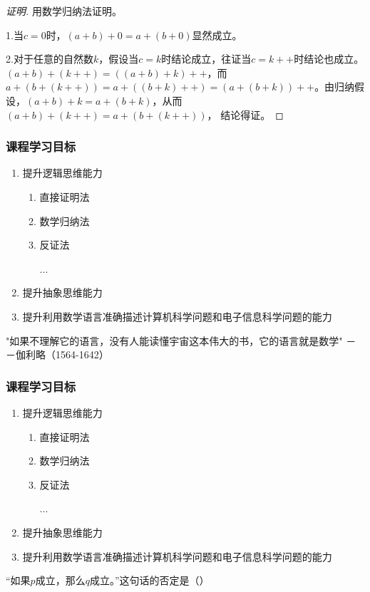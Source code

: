 \documentclass{beamer}
\begin{document}
\begin{CJK*}{UTF8}{gbsn}
\begin{frame}
\begin{proof}[证明]\justifying\let\raggedright\justifying

  用数学归纳法证明。

  1.当$c=0$时，$(a+b)+0=a+(b+0)$显然成立。

  2.对于任意的自然数$k$，假设当$c=k$时结论成立，往证当$c=k++$时结论也成立。$(a+b)+(k++)=((a+b)+k)++$，而$a+(b+(k++))=a+((b+k)++)=(a+(b+k))++$。由归纳假设，$(a+b)+k=a+(b+k)$，从而$(a+b)+(k++)=a+(b+(k++))$，
  结论得证。
\end{proof}
\end{frame}
\begin{frame}
  \frametitle{课程学习目标}
\begin{enumerate}
\item 提升逻辑思维能力
  \begin{enumerate}
  \item 直接证明法
  \item 数学归纳法
  \item 反证法

    ...
  \end{enumerate}
\item 提升抽象思维能力
\item 提升利用数学语言准确描述计算机科学问题和电子信息科学问题的能力
\end{enumerate}
\end{frame}
\begin{frame}
  "如果不理解它的语言，没有人能读懂宇宙这本伟大的书，它的语言就是数学"
  －－伽利略（1564-1642）
\end{frame}
\begin{frame}
  \frametitle{课程学习目标}
\begin{enumerate}
\item 提升逻辑思维能力
  \begin{enumerate}
  \item 直接证明法
  \item 数学归纳法
  \item 反证法

    ...
  \end{enumerate}
\item 提升抽象思维能力
\item 提升利用数学语言准确描述计算机科学问题和电子信息科学问题的能力
\end{enumerate}
\end{frame}
\begin{frame}
  “如果$p$成立，那么$q$成立。”这句话的否定是（）


\end{frame}
\end{CJK*}
\end{document}
